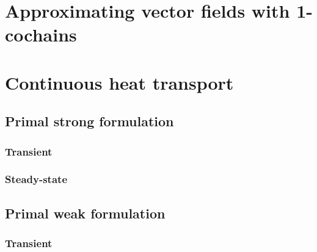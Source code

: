 \documentclass[fleqn]{article}
\theoremstyle{definition}
\begin{document}
\section{Approximating vector fields with 1-cochains}
\label{section:approximating_vector_fields_with_1_cochains}













\section{Continuous heat transport}
\label{section:continuous_heat_transport}


\subsection{Primal strong formulation}
\subsubsection{Transient}

\subsubsection{Steady-state}

\subsection{Primal weak formulation}
\subsubsection{Transient}


\end{document}
